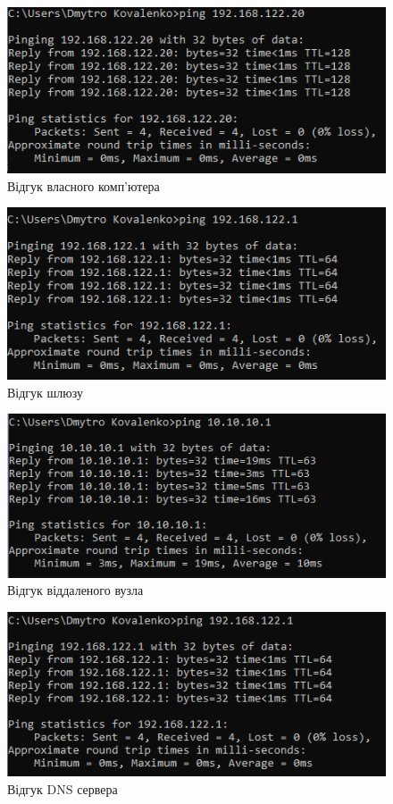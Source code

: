 \documentclass{article}
\begin{document}
\begin{normalsize}
\begin{figure}[H]
	\centering
	\includegraphics[scale=0.8]{p12220}
	\caption{Відгук власного комп'ютера}
\end{figure}

\begin{figure}[H]
	\centering
	\includegraphics[scale=0.8]{p1221}
	\caption{Відгук шлюзу}
\end{figure}

\begin{figure}[H]
	\centering
	\includegraphics[scale=0.8]{p101}
	\caption{Відгук віддаленого вузла}
\end{figure}

\begin{figure}[H]
	\centering
	\includegraphics[scale=0.8]{pdns}
	\caption{Відгук DNS сервера}
\end{figure}


\end{normalsize}
\end{document}
